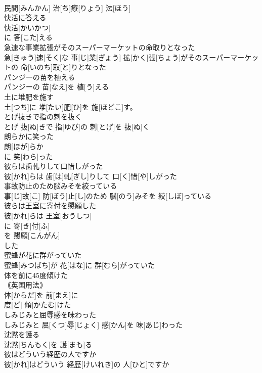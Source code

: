 \documentclass[8pt]{extreport}
\begin{document}
\begin{CJK}{UTF8}{min}
\\	民間[みんかん] 治[ち]療[りょう] 法[ほう]
\\	快活に答える	
\\	快活[かいかつ]
\\	に 答[こた]える 
\\	急速な事業拡張がそのスーパーマーケットの命取りとなった	
\\	急[きゅう]速[そく]な 事[じ]業[ぎょう] 拡[かく]張[ちょう]がそのスーパーマーケットの 命[いのち]取[と]りとなった
\\	パンジーの苗を植える	
\\	パンジーの 苗[なえ]を 植[う]える
\\	土に堆肥を施す	
\\	土[つち]に 堆[たい]肥[ひ]を 施[ほどこ]す。
\\	とげ抜きで指の刺を抜く	
\\	とげ 抜[ぬ]きで 指[ゆび]の 刺[とげ]を 抜[ぬ]く
\\	朗らかに笑った	
\\	朗[ほが]らか 
\\	に 笑[わら]った 
\\	彼らは歯軋りして口惜しがった	
\\	彼[かれ]らは 歯[は]軋[ぎし]りして 口[く]惜[や]しがった
\\	事故防止のため脳みそを絞っている	
\\	事[じ]故[こ] 防[ぼう]止[し]のため 脳[のう]みそを 絞[しぼ]っている
\\	彼らは王室に寄付を懇願した	
\\	彼[かれ]らは 王室[おうしつ]
\\	に 寄[き]付[ふ]
\\	を 懇願[こんがん]
\\	した 
\\	蜜蜂が花に群がっていた	
\\	蜜蜂[みつばち]が 花[はな]に 群[むら]がっていた
\\	体を前に45度傾けた	
\\	｟英国用法｠
\\	体[からだ]を 前[まえ]に 
\\	度[ど] 傾[かたむ]けた
\\	しみじみと屈辱感を味わった	
\\	しみじみと 屈[くつ]辱[じょく] 感[かん]を 味[あじ]わった
\\	沈黙を護る	
\\	沈黙[ちんもく]を 護[まも]る
\\	彼はどういう経歴の人ですか	
\\	彼[かれ]はどういう 経歴[けいれき]の 人[ひと]ですか

\end{CJK}
\end{document}
